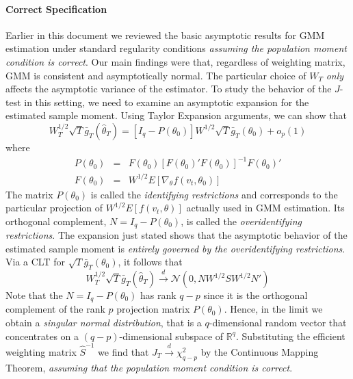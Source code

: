 \paragraph{Correct Specification}
Earlier in this document we reviewed the basic asymptotic results for GMM estimation under standard regularity conditions \emph{assuming the population moment condition is correct}. Our main findings were that, regardless of weighting matrix, GMM is consistent and asymptotically normal. The particular choice of $W_T$ \emph{only} affects the asymptotic variance of the estimator. To study the behavior of the $J$-test in this setting, we need to examine an asymptotic expansion for the estimated sample moment. Using Taylor Expansion arguments, we can show that
	$$W_T^{1/2} \sqrt{T} \bar{g}_T(\widehat{\theta}_T) = \left[I_q - P(\theta_0) \right]W^{1/2} \sqrt{T} \bar{g}_T(\theta_0) + o_p(1)$$
where 
	\begin{eqnarray*}
	P(\theta_0) &=& F(\theta_0) \left[F(\theta_0)' F(\theta_0) \right]^{-1} F(\theta_0)'\\
		F(\theta_0) &=& W^{1/2} E[\nabla_\theta f(v_t, \theta_0)]
	\end{eqnarray*}
The matrix $P(\theta_0)$ is called the \emph{identifying restrictions} and corresponds to the particular projection of $W^{1/2}E[f(v_t,\theta)]$ actually used in GMM estimation. Its orthogonal complement, $N = I_q - P(\theta_0)$, is called the \emph{overidentifying restrictions}. The expansion just stated shows that the asymptotic behavior of the estimated sample moment is \emph{entirely governed by the overidentifying restrictions}. Via a CLT for $\sqrt{T} \bar{g}_T(\theta_0)$, it follows that
	$$W_T^{1/2} \sqrt{T} \bar{g}_T(\widehat{\theta}_T) \overset{d}{\rightarrow} \mathcal{N}(0, NW^{1/2}S W^{1/2}N')$$
Note that the $N = I_q - P(\theta_0)$ has rank $q-p$ since it is the orthogonal complement of the rank $p$ projection matrix $P(\theta_0)$. Hence, in the limit we obtain a \emph{singular normal distribution}, that is a $q$-dimensional random vector that concentrates on a $(q-p)$-dimensional subspace of $\mathbb{R}^q$. Substituting the efficient weighting matrix $\widehat{S}^{-1}$ we find that $J_T \overset{d}{\rightarrow} \chi^2_{q-p}$ by the Continuous Mapping Theorem, \emph{assuming that the population moment condition is correct}.

